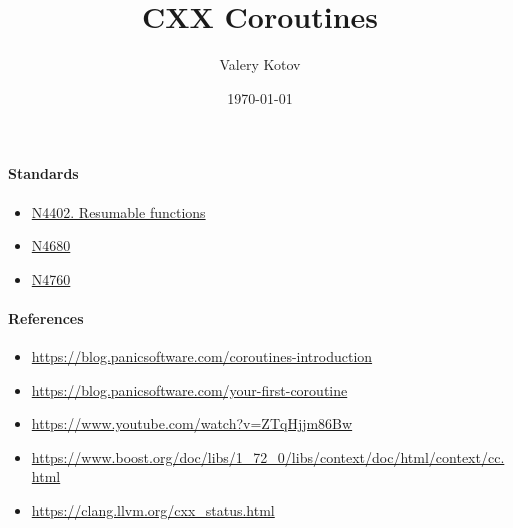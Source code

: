 \documentclass{article}
\title{CXX Coroutines}
\author{Valery Kotov}
\date{\today}
\begin{document}
\maketitle

\paragraph{Standards}

\begin{itemize}
\item \href{https://isocpp.org/files/papers/N4402.pdf}{N4402. Resumable functions}
\item \href{http://www.open-std.org/jtc1/sc22/wg21/docs/papers/2017/n4680.pdf}{N4680}
\item \href{http://www.open-std.org/jtc1/sc22/wg21/docs/papers/2018/n4760.pdf}{N4760}
\end{itemize}

\paragraph{References}

\begin{itemize}
\item \url{https://blog.panicsoftware.com/coroutines-introduction}
\item \url{https://blog.panicsoftware.com/your-first-coroutine}
\item \url{https://www.youtube.com/watch?v=ZTqHjjm86Bw}
\item \url{https://www.boost.org/doc/libs/1_72_0/libs/context/doc/html/context/cc.html}
\item \url{https://clang.llvm.org/cxx_status.html}
\end{itemize}
\end{document}
